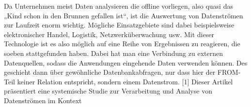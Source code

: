 Da Unternehmen meist Daten analysieren die offline vorliegen, also quasi das „Kind schon in den Brunnen gefallen ist“, ist die Auswertung von Datenströmen zur Laufzeit enorm wichtig. Mögliche Einsatzgebiete sind dabei beispielsweise elektronischer Handel, Logistik, Netzwerküberwachung usw. 
Mit dieser Technologie ist es also möglich auf eine Reihe von Ergebnissen zu reagieren, die soeben stattgefunden haben. Dabei hat man eine Verbindung zu externen Datenquellen, sodass die Anwendungen eingehende Daten verwenden können. Des geschieht dann über gewöhnliche Datenbankabfragen, nur dass hier der FROM-Teil keiner Relation entspricht, sondern einem Datenstrom. [1]
Dieser Artikel präsentiert eine systemische Studie zur Verarbeitung und Analyse von Datenströmen im Kontext

